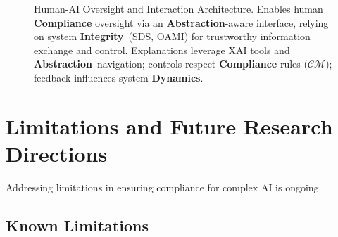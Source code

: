 \documentclass[12pt,a4paper]{report}
\newcommand{\Integrity}{\textbf{Integrity}}
\newcommand{\Abstraction}{\textbf{Abstraction}}
\newcommand{\Dynamics}{\textbf{Dynamics}}
\begin{document}
\begin{figure}[ht]
		\caption[Human-AI Oversight Architecture]{Human-AI Oversight and Interaction Architecture. Enables human \textbf{Compliance} oversight via an \Abstraction-aware interface, relying on system \Integrity\ (SDS, OAMI) for trustworthy information exchange and control. Explanations leverage XAI tools and \Abstraction\ navigation; controls respect \textbf{Compliance} rules ($\mathcal{CM}$); feedback influences system \Dynamics.}
		\label{fig:human-oversight}
	\end{figure}
	
	\section{Limitations and Future Research Directions} %
	\label{sec:5-8} %
	
	Addressing limitations in ensuring compliance for complex AI is ongoing.
	
	\subsection{Known Limitations} %
	\label{sec:5-8-1} %
	
\end{document}

